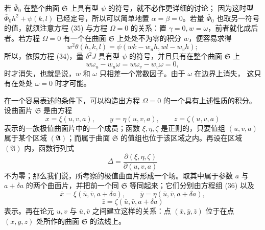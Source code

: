 \documentclass[11pt,a4paper,leqno]{article}
\begin{document}
若 $\bar\Phi_0$ 在整个曲面 $\mathfrak{S}$ 上具有型 $\psi$ 的符号，就不必作更详细的讨论；
因为这时型 $\bar\Phi_0h^2+\psi(k,l)$ 已经定号，所以可以简单地置
$\alpha=\beta=0$。若量 $\bar\Phi_0$ 也取另一符号的值，就须注意方程 (35) 与方程
$\Omega=0$ 的关系：置 $\gamma=0,w=\omega$，前者就化成后者。若方程
$\Omega=0$ 有一个在曲面 $\mathfrak{S}$ 上处处不为零的积分 $w$，便容易求得
\[
w^2\theta(h,k,l)=\psi(wk-w_uh,wl-w_vh);
\]
所以，依照方程 (34)，量 $\delta^2J$ 具有型 $\psi$ 的符号，并且只有在整个曲面
$\mathfrak{S}$ 上
\[
w\omega_u-w_u\omega=w\omega_v-w_v\omega=0,
\]
时才消失，也就是说，$w$ 和 $\omega$ 只相差一个常数因子。由于 $\omega$ 在边界上消失，
这只有在处处 $\omega=0$ 时才可能。

在一个容易表述的条件下，可以构造出方程 $\Omega=0$ 的一个具有上述性质的积分。设曲面片
$\mathfrak{S}$ 是由方程
\begin{equation}\tag{36}
x=\xi(u,v,a),\qquad y=\eta(u,v,a),\qquad z=\zeta(u,v,a)
\end{equation}
表示的一族极值曲面片中的一个成员；函数 $\xi,\eta,\zeta$ 是正则的，只要值组
$(u,v,a)$ 属于某个区域 $(\mathfrak{A})$；而属于曲面
$\mathfrak{S}$ 的值组也位于该区域之内。再设在区域 $(\mathfrak{A})$ 内，函数行列式
\[
\Delta=\frac{\partial(\xi,\eta,\zeta)}{\partial(u,v,a)}
\]
不为零；那么我们说，所考察的极值曲面片形成一个场。取其中属于参数 $a$ 与
$a+\delta a$ 的两个曲面片，并把前一个同 $\mathfrak{S}$ 等同起来；它们分别由方程组
(36) 以及
\[
\bar x=\xi(\bar u,\bar v,a+\delta a),\qquad
\bar y=\eta(\bar u,\bar v,a+\delta a),
\]
\[
\bar z=\zeta(\bar u,\bar v,a+\delta a)
\]
表示。再在论元 $u,v$ 与 $\bar u,\bar v$ 之间建立这样的关系：点
$(\bar x,\bar y,\bar z)$ 位于在点 $(x,y,z)$ 处所作的曲面 $\mathfrak{S}$ 的法线上。
\end{document}
